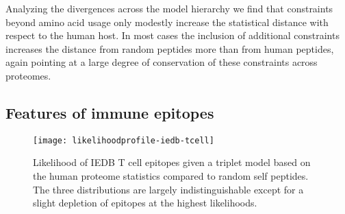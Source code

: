 \documentclass[superscriptaddress,twocolumn,pre]{revtex4}
\newcommand{\<}{\langle}
\renewcommand{\>}{\rangle}
\begin{document}
Analyzing the divergences across the model hierarchy we find that constraints beyond amino acid usage only modestly increase the statistical distance with respect to the human host. In most cases the inclusion of additional constraints increases the distance from random peptides more than from human peptides, again pointing at a large degree of conservation of these constraints across proteomes.







\subsection{Features of immune epitopes}

\begin{figure}
    \texttt{[image: likelihoodprofile-iedb-tcell]}
    \caption{Likelihood of IEDB T cell epitopes given a triplet model based on the human proteome statistics compared to random self peptides. The three distributions are largely indistinguishable except for a slight depletion of epitopes at the highest likelihoods.
    \label{figtcelliedb}
    }
\end{figure}
\end{document}
